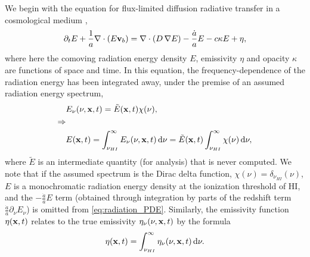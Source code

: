 \documentclass[letterpaper,10pt]{article}
\renewcommand{\(}{\left(}
\renewcommand{\)}{\right)}
\newcommand{\vb}{{\bf v}_b}
\newcommand{\xvec}{{\bf x}}
\begin{document}
We begin with the equation for flux-limited diffusion radiative
transfer in a cosmological medium \cite{ReynoldsHayesPaschosNorman2009},
\begin{equation}
\label{eq:radiation_PDE}
  \partial_{t} E + \frac1a \nabla\cdot\(E\vb\) =
    \nabla\cdot\(D\,\nabla E\) - \frac{\dot{a}}{a} E - c\kappa E + \eta,
\end{equation}
where here the comoving radiation energy density $E$, emissivity
$\eta$ and opacity $\kappa$ are functions of space and time.  In this
equation, the frequency-dependence of the radiation energy has been
integrated away, under the premise of an assumed radiation energy
spectrum, 
\begin{align}
  \notag
  & E_{\nu}(\nu,\xvec,t) = \tilde{E}(\xvec,t) \chi(\nu), \\
  \notag
  \Rightarrow & \\
  \label{eq:spectrum}
  & E(\xvec,t) = \int_{\nu_{HI}}^{\infty} E_{\nu}(\nu,\xvec,t)\,\mathrm{d}\nu 
    = \tilde{E}(\xvec,t) \int_{\nu_{HI}}^{\infty} \chi(\nu)\,\mathrm{d}\nu,
\end{align}
where $\tilde{E}$ is an intermediate quantity (for analysis) that is
never computed.  We note that if the assumed spectrum is the Dirac
delta function, $\chi(\nu) = \delta_{\nu_{HI}}(\nu)$, $E$ is a
monochromatic radiation energy density at the ionization threshold of
HI, and the $-\frac{\dot{a}}{a}E$ term (obtained through integration
by parts of the redshift term
$\frac{\dot{a}}{a}\partial_{\nu}E_{\nu}$) is omitted from
\eqref{eq:radiation_PDE}. Similarly, the emissivity function
$\eta(\xvec,t)$ relates to the true emissivity
$\eta_{\nu}(\nu,\xvec,t)$ by the formula
\begin{equation}
\label{eq:emissivity}
  \eta(\xvec,t) = \int_{\nu_{HI}}^{\infty}\eta_{\nu}(\nu,\xvec,t)\,\mathrm{d}\nu.
\end{equation}
\end{document}

